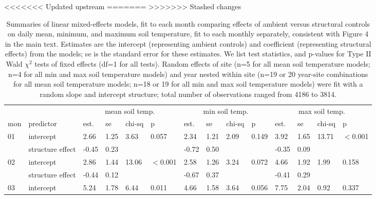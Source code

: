\documentclass{article}
\begin{document}
<<<<<<< Updated upstream
=======
>>>>>>> Stashed changes
\begin{table}[ht]
\centering
\caption{Summaries of linear mixed-effects models, fit to each month comparing effects of ambient versus structural controls on daily mean, minimum, and maximum soil temperature, fit to each monthly separately, consistent with Figure 4 in the main text. Estimates are the intercept (representing ambient controls) and coefficient (representing structural effects) from the models; se is the standard error for these estimates. We list test statistics, and p-values for Type II Wald $\chi^{2}$ tests of fixed effects (df=1 for all tests). Random effects of site (n=5 for all mean soil temperature models; n=4 for all min and max soil temperature models) and year nested within site (n=19 or 20 year-site combinations for all mean soil temperature models; n=18 or 19 for all min and max soil temperature models) were fit with a random slope and intercept structure; total number of observations ranged from 4186 to 3814.} 
\label{table:shamamb_stempm}
\begin{tabular}{|p{}|p{}|p{}p{}p{}p{}|p{}p{}p{}p{}|p{}p{}p{}p{}|}
  \hline
  & &\multicolumn{4}{c}{mean soil temp.} &\multicolumn{4}{c}{min soil temp.} &\multicolumn{4}{c}{max soil temp.}\\
 mon & predictor & est. & se & chi-sq & p & est. & se & chi-sq & p & est. & se & chi-sq & p\\
 \hline
01 & intercept & 2.66 & 1.25 & 3.63 & 0.057 & 2.34 & 1.21 & 2.09 & 0.149 & 3.92 & 1.65 & 13.71 & $<$0.001 \\ 
    & structure effect & -0.45 & 0.23 &  &  & -0.72 & 0.50 &  &  & -0.35 & 0.09 &  &  \\ 
   \hline
02 & intercept & 2.86 & 1.44 & 13.06 & $<$0.001 & 2.58 & 1.26 & 3.24 & 0.072 & 4.66 & 1.92 & 1.99 & 0.158 \\ 
    & structure effect & -0.44 & 0.12 &  &  & -0.67 & 0.37 &  &  & -0.41 & 0.29 &  &  \\ 
   \hline
03 & intercept & 5.24 & 1.78 & 6.44 & 0.011 & 4.66 & 1.58 & 3.64 & 0.056 & 7.75 & 2.04 & 0.92 & 0.337 \\ 

\end{tabular}
\end{table}
\end{document}
